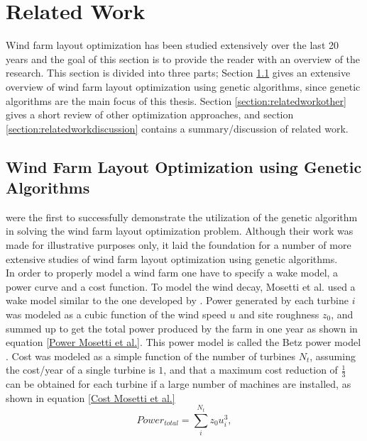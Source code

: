 \chapter{Related Work}\label{chapter:relatedwork}
Wind farm layout optimization has been studied extensively over the last 20 years and the goal of this section is to provide the reader with an overview of the research. This section is divided into three parts; Section \ref{section:relatedworkga} gives an extensive overview of wind farm layout optimization using genetic algorithms, since genetic algorithms are the main focus of this thesis. Section \ref{section:relatedworkother} gives a short review of other optimization approaches, and section \ref{section:relatedworkdiscussion} contains a summary/discussion of related work.


\section{Wind Farm Layout Optimization using Genetic Algorithms}\label{section:relatedworkga}


\cite{Mosetti} were the first to successfully demonstrate the utilization of the genetic algorithm in solving the wind farm layout optimization problem. Although their work was made for illustrative purposes only, it laid the foundation for a number of more extensive studies of wind farm layout optimization using genetic algorithms.\\

\noindent In order to properly model a wind farm one have to specify a wake model, a power curve and a cost function. To model the wind decay, Mosetti et al. used a wake model similar to the one developed by \cite{Jensen}. Power generated by each turbine $i$ was modeled as a cubic function of the wind speed $u$ and site roughness $z_0$, and summed up to get the total power produced by the farm in one year as shown in equation \ref{Power Mosetti et al.}. This power model is called the Betz power model \citep{Albring}. Cost was modeled as a simple function of the number of turbines $N_t$, assuming the cost/year of a single turbine is $1$, and that a maximum cost reduction of $\frac{1}{3}$ can be obtained for each turbine if a large number of machines are installed, as shown in equation \ref{Cost Mosetti et al.} \\


\begin{equation}
\label{Power Mosetti et al.}
Power_{total} = \sum^{N_t}_{i} z_0u_i^3,
\end{equation}


